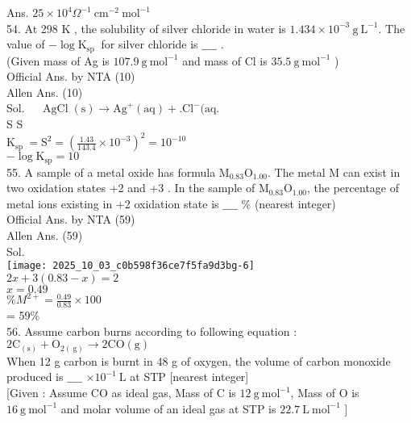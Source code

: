 \documentclass[10pt]{article}
\begin{document}
Ans. \(25 \times 10^{4} \Omega^{-1} \mathrm{~cm}^{-2} \mathrm{~mol}^{-1}\)\\
54. At 298 K , the solubility of silver chloride in water is \(1.434 \times 10^{-3} \mathrm{~g} \mathrm{~L}^{-1}\). The value of \(-\log \mathrm{K}_{\text {sp }}\) for silver chloride is \(\_\_\_\_\) .\\
(Given mass of Ag is \(107.9 \mathrm{~g} \mathrm{~mol}^{-1}\) and mass of Cl is \(35.5 \mathrm{~g} \mathrm{~mol}^{-1}\) )\\
Official Ans. by NTA (10)\\
Allen Ans. (10)\\
Sol. \(\quad \operatorname{AgCl}(\mathrm{s}) \rightarrow \mathrm{Ag}^{+}(\mathrm{aq})+.\mathrm{Cl}^{-}(\mathrm{aq}\).\\
S S\\
\(\mathrm{K}_{\text {sp }}=\mathrm{S}^{2}=\left(\frac{1.43}{143.4} \times 10^{-3}\right)^{2}=10^{-10}\)\\
\(-\log \mathrm{K}_{\mathrm{sp}}=10\)\\
55. A sample of a metal oxide has formula \(\mathrm{M}_{0.83} \mathrm{O}_{1.00}\). The metal M can exist in two oxidation states +2 and +3 . In the sample of \(\mathrm{M}_{0.83} \mathrm{O}_{1.00}\), the percentage of metal ions existing in +2 oxidation state is \(\_\_\_\_\) \% (nearest integer)\\
Official Ans. by NTA (59)\\
Allen Ans. (59)\\
Sol.\\
\texttt{[image: 2025\_10\_03\_c0b598f36ce7f5fa9d3bg-6]}\\
\(2 x+3(0.83-x)=2\)\\
\(x=0.49\)\\
\(\% M^{2+}=\frac{0.49}{0.83} \times 100\)\\
= 59\%\\
56. Assume carbon burns according to following equation :\\
\(2 \mathrm{C}_{(\mathrm{s})}+\mathrm{O}_{2(\mathrm{~g})} \rightarrow 2 \mathrm{CO}(\mathrm{g})\)\\
When 12 g carbon is burnt in 48 g of oxygen, the volume of carbon monoxide produced is \(\_\_\_\_\) \(\times 10^{-1} \mathrm{~L}\) at STP [nearest integer]\\[0pt]
[Given : Assume CO as ideal gas, Mass of C is \(12 \mathrm{~g} \mathrm{~mol}^{-1}\), Mass of O is \(16 \mathrm{~g} \mathrm{~mol}^{-1}\) and molar volume of an ideal gas at STP is \(22.7 \mathrm{~L} \mathrm{~mol}^{-1}\) ]\\
\end{document}
